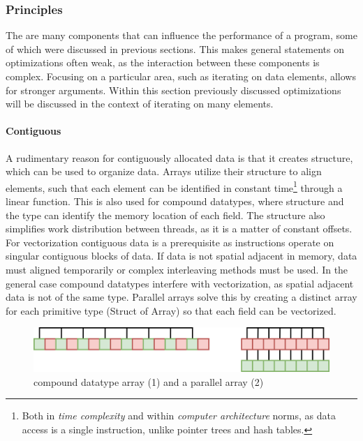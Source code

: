 \documentclass{article}
\begin{document}
\newpage

\subsubsection{Principles}

The are many components that can influence the performance of a program, some of which were discussed in previous sections.
This makes general statements on optimizations often weak, as the interaction between these components is complex.
Focusing on a particular area, such as iterating on data elements, allows for stronger arguments.
Within this section previously discussed optimizations will be discussed in the context of iterating on many elements.

\paragraph{Contiguous} 

A rudimentary reason for contiguously allocated data is that it creates structure, which can be used to organize data.
Arrays utilize their structure to align elements, such that each element can be identified in constant time\footnote{Both in {\it time complexity} and within {\it computer architecture} norms, as data access is a single instruction, unlike pointer trees and hash tables. } through a linear function.
This is also used for compound datatypes, where structure and the type can identify the memory location of each field.
The structure also simplifies work distribution between threads, as it is a matter of constant offsets.
For vectorization contiguous data is a prerequisite as instructions operate on singular contiguous blocks of data.
If data is not spatial adjacent in memory, data must aligned temporarily or complex interleaving methods must be used\cite{interleaved-SIMD}.
In the general case compound datatypes interfere with vectorization, as spatial adjacent data is not of the same type.
Parallel arrays solve this by creating a distinct array for each primitive type (Struct of Array) so that each field can be vectorized.

\begin{figure}[ht]
    \centering
    \includegraphics[scale=0.2]{parallelarray}
    \caption{ compound datatype array (1) and a parallel array (2) }
\end{figure}
\end{document}
